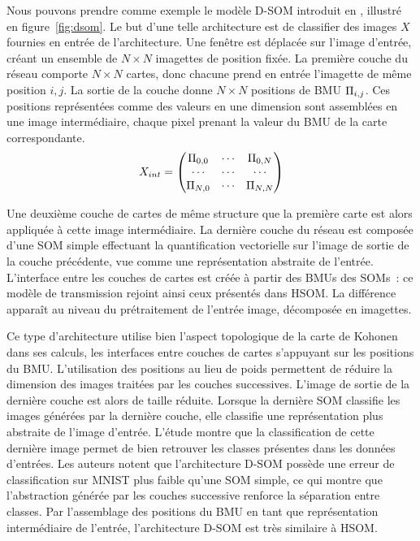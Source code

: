 \documentclass[../main]{subfiles}
\begin{document}
Nous pouvons prendre comme exemple le modèle D-SOM introduit en \cite{liu_deep_2015,wickramasinghe_deep_2019}, illustré en figure~\ref{fig:dsom}.
Le but d'une telle architecture est de classifier des images $X$ fournies en entrée de l'architecture.
Une fenêtre est déplacée sur l'image d'entrée, créant un ensemble de $N\times N$ imagettes de position fixée. La première couche du réseau comporte $N \times N$ cartes, donc chacune prend en entrée l'imagette de même position $i,j$.
La sortie de la couche donne $N  \times N$ positions de BMU $\Pi_{i,j}$.
Ces positions représentées comme des valeurs en une dimension sont assemblées en une image intermédiaire, chaque pixel prenant la valeur du BMU de la carte correspondante.
    $$X_{int} = \begin{pmatrix}
    \Pi_{0,0}  &  \cdots & \Pi_{0,N} \\
    \cdots & \cdots & \cdots \\
    \Pi_{N,0} & \cdots & \Pi_{N,N}
    \end{pmatrix} $$

Une deuxième couche de cartes de même structure que la première carte est alors appliquée à cette image intermédiaire. La dernière couche du réseau est composée d'une SOM simple effectuant la quantification vectorielle sur l'image de sortie de la couche précédente, vue comme une représentation abstraite de l'entrée.
L'interface entre les couches de cartes est créée à partir des BMUs des SOMs~: ce modèle de transmission rejoint ainsi ceux présentés dans HSOM. La différence apparaît au niveau du prétraitement de l'entrée image, décomposée en imagettes.

Ce type d'architecture utilise bien l'aspect topologique de la carte de Kohonen dans ses calculs, les interfaces entre couches de cartes s'appuyant sur les positions du BMU. L'utilisation des positions au lieu de poids permettent de réduire la dimension des images traitées par les couches successives. L'image de sortie de la dernière couche est alors de taille réduite. Lorsque la dernière SOM classifie les images générées par la dernière couche, elle classifie une représentation plus abstraite de l'image d'entrée. L'étude montre que la classification de cette dernière image permet de bien retrouver les classes présentes dans les données d'entrées. Les auteurs notent que l'architecture D-SOM possède une erreur de classification sur MNIST plus faible qu'une SOM simple, ce qui montre que l'abstraction générée par les couches successive renforce la séparation entre classes.
Par l'assemblage des positions du BMU en tant que représentation intermédiaire de l'entrée, l'architecture D-SOM est très similaire à HSOM.
\end{document}
